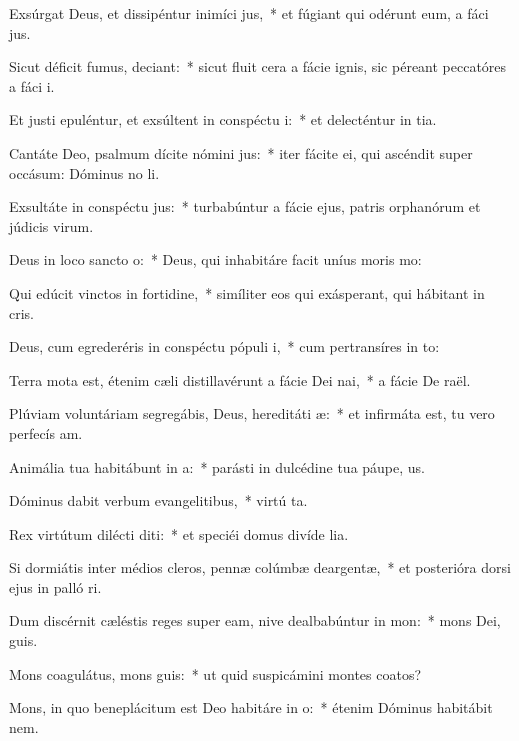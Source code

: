 \item Exsúrgat Deus, et dissipéntur inimíci jus,~* et fúgiant qui odérunt eum, a fáci jus.
\item Sicut déficit fumus, deciant:~* sicut fluit cera a fácie ignis, sic péreant peccatóres a fáci i.
\item Et justi epuléntur, et exsúltent in conspéctu i:~* et delecténtur in tia.
\item Cantáte Deo, psalmum dícite nómini jus:~* iter fácite ei, qui ascéndit super occásum: Dóminus no li.
\item Exsultáte in conspéctu jus:~* turbabúntur a fácie ejus, patris orphanórum et júdicis virum.
\item Deus in loco sancto o:~* Deus, qui inhabitáre facit uníus moris  mo:
\item Qui edúcit vinctos in fortidine,~* simíliter eos qui exásperant, qui hábitant in cris.
\item Deus, cum egrederéris in conspéctu pópuli i,~* cum pertransíres in to:
\item Terra mota est, étenim cæli distillavérunt a fácie Dei nai,~* a fácie De raël.
\item Plúviam voluntáriam segregábis, Deus, hereditáti æ:~* et infirmáta est, tu vero perfecís am.
\item Animália tua habitábunt in a:~* parásti in dulcédine tua páupe, us.
\item Dóminus dabit verbum evangelitibus,~* virtú ta.
\item Rex virtútum dilécti diti:~* et speciéi domus divíde lia.
\item Si dormiátis inter médios cleros, pennæ colúmbæ deargentæ,~* et posterióra dorsi ejus in palló ri.
\item Dum discérnit cæléstis reges super eam, nive dealbabúntur in mon:~* mons Dei,  guis.
\item Mons coagulátus, mons guis:~* ut quid suspicámini montes coatos?
\item Mons, in quo beneplácitum est Deo habitáre in o:~* étenim Dóminus habitábit  nem.
